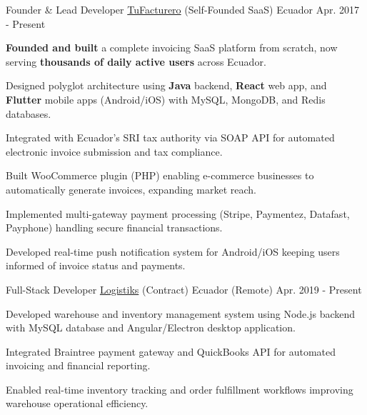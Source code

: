 \begin{cventries}
  \cventry
    {Founder \& Lead Developer} %
    {\href{https://tufacturero.ec}{TuFacturero} (Self-Founded SaaS)} %
    {Ecuador} %
    {Apr. 2017 - Present} %
    {
      \begin{cvitems} %
        \item {\textbf{Founded and built} a complete invoicing SaaS platform from scratch, now serving \textbf{thousands of daily active users} across Ecuador.}
        \item {Designed polyglot architecture using \textbf{Java} backend, \textbf{React} web app, and \textbf{Flutter} mobile apps (Android/iOS) with MySQL, MongoDB, and Redis databases.}
        \item {Integrated with Ecuador's SRI tax authority via SOAP API for automated electronic invoice submission and tax compliance.}
        \item {Built WooCommerce plugin (PHP) enabling e-commerce businesses to automatically generate invoices, expanding market reach.}
        \item {Implemented multi-gateway payment processing (Stripe, Paymentez, Datafast, Payphone) handling secure financial transactions.}
        \item {Developed real-time push notification system for Android/iOS keeping users informed of invoice status and payments.}
      \end{cvitems}
    }

  \cventry
    {Full-Stack Developer} %
    {\href{https://logistiksusa.com/}{Logistiks} (Contract)} %
    {Ecuador (Remote)} %
    {Apr. 2019 - Present} %
    {
      \begin{cvitems} %
        \item {Developed warehouse and inventory management system using Node.js backend with MySQL database and Angular/Electron desktop application.}
        \item {Integrated Braintree payment gateway and QuickBooks API for automated invoicing and financial reporting.}
        \item {Enabled real-time inventory tracking and order fulfillment workflows improving warehouse operational efficiency.}
      \end{cvitems}
    }


\end{cventries}
